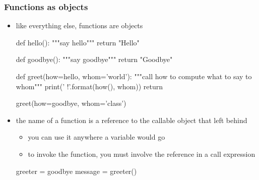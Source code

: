 \begin{frame}[fragile]
%
  \frametitle{Functions as objects}
%
  \begin{itemize}
%
  \item like everything else, functions are objects
    \begin{ipython}{}
      def hello():
          """say hello"""
          return "Hello"
      
      def goodbye():
          """say goodbye"""
          return "Goodbye"

      def greet(how=hello, whom='world'):
          """call {how} to compute what to say to {whom}"""
          print('{} {}!'.format(how(), whom))
          return
          
      greet(how=goodbye, whom='class')
    \end{ipython}
%
  \item the name of a function is a reference to the callable object that  left
    behind
    \begin{itemize}
    \item you can use it anywhere a variable would go
    \item to invoke the function, you must involve the reference in a call expression
    \end{itemize}
    \begin{ipython}{}
      greeter = goodbye
      message = greeter()
    \end{ipython}
%
  \end{itemize}
%
\end{frame}

